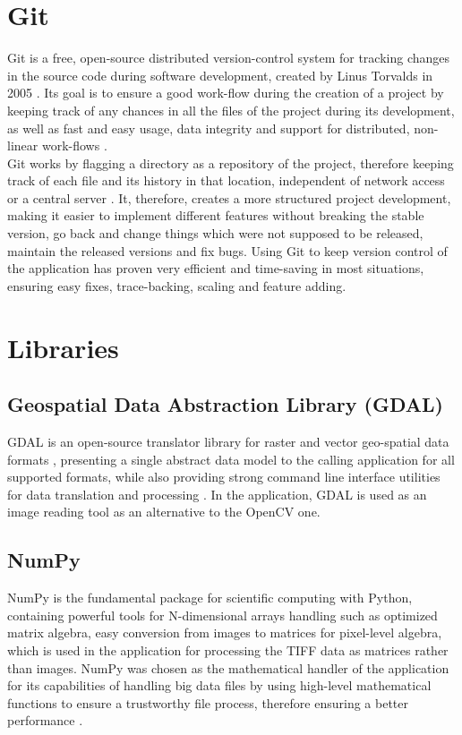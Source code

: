 \documentclass[12pt, a4paper]{report}
\begin{document}
	\section{Git}
	Git is a free, open-source distributed version-control system for tracking changes in the source code during software development, created by Linus Torvalds in 2005 \cite{git_general}\cite{git_definition}. Its goal is to ensure a good work-flow during the creation of a project by keeping track of any chances in all the files of the project during its development, as well as fast and easy usage, data integrity\cite{git_general} \cite{git_linus_1} and support for distributed, non-linear work-flows \cite{git_linus_2} \cite{git_general}. \\
	Git works by flagging a directory as a repository of the project, therefore keeping track of each file and its history in that location, independent of network access or a central server \cite{git_general}. It, therefore, creates a more structured project development, making it easier to implement different features without breaking the stable version, go back and change things which were not supposed to be released, maintain the released versions and fix bugs. 
	Using Git to keep version control of the application has proven very efficient and time-saving in most situations, ensuring easy fixes, trace-backing, scaling and feature adding. 
	
	\section{Libraries}
	\subsection{Geospatial Data Abstraction Library (GDAL)}
	GDAL is an open-source translator library for raster and vector geo-spatial data formats \cite{gdal_general}, presenting a single abstract data model to the calling application for all supported formats, while also providing strong command line interface utilities for data translation and processing \cite{gdal_1}. In the application, GDAL is used as an image reading tool as an alternative to the OpenCV one. 
	
	\subsection{NumPy}
	NumPy is the fundamental package for scientific computing with Python, containing powerful tools for N-dimensional arrays handling \cite{numpy_definition} such as optimized matrix algebra, easy conversion from images to matrices for pixel-level algebra, which is used in the application for processing the TIFF data as matrices rather than images. NumPy was chosen as the mathematical handler of the application for its capabilities of handling big data files by using high-level mathematical functions to ensure a trustworthy file process, therefore ensuring a better performance \cite{numpy_wiki}.
	
\end{document}
